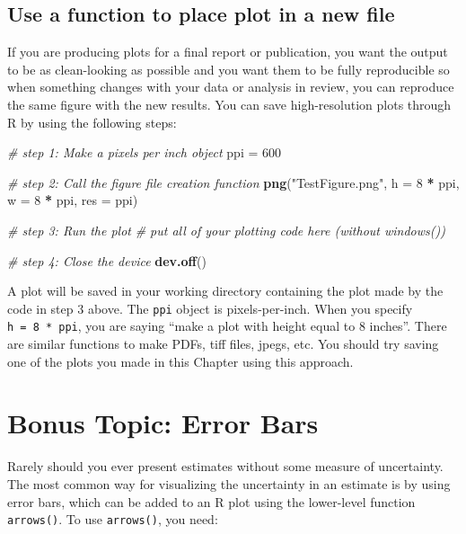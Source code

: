 \documentclass[]{book}
\newenvironment{Shaded}{\begin{snugshade}}{\end{snugshade}}
\newcommand{\KeywordTok}[1]{\textcolor[rgb]{0.13,0.29,0.53}{\textbf{#1}}}
\newcommand{\DataTypeTok}[1]{\textcolor[rgb]{0.13,0.29,0.53}{#1}}
\newcommand{\DecValTok}[1]{\textcolor[rgb]{0.00,0.00,0.81}{#1}}
\newcommand{\StringTok}[1]{\textcolor[rgb]{0.31,0.60,0.02}{#1}}
\newcommand{\CommentTok}[1]{\textcolor[rgb]{0.56,0.35,0.01}{\textit{#1}}}
\newcommand{\OperatorTok}[1]{\textcolor[rgb]{0.81,0.36,0.00}{\textbf{#1}}}
\newcommand{\NormalTok}[1]{#1}
\theoremstyle{definition}
\theoremstyle{definition}
\theoremstyle{definition}
\theoremstyle{remark}
\begin{document}
\subsection{Use a function to place plot in a new
file}\label{file-devices}

If you are producing plots for a final report or publication, you want
the output to be as clean-looking as possible and you want them to be
fully reproducible so when something changes with your data or analysis
in review, you can reproduce the same figure with the new results. You
can save high-resolution plots through R by using the following steps:

\begin{Shaded}
\begin{Highlighting}[]
\CommentTok{# step 1: Make a pixels per inch object}
\NormalTok{ppi =}\StringTok{ }\DecValTok{600}

\CommentTok{# step 2: Call the figure file creation function}
\KeywordTok{png}\NormalTok{(}\StringTok{"TestFigure.png"}\NormalTok{, }\DataTypeTok{h =} \DecValTok{8} \OperatorTok{*}\StringTok{ }\NormalTok{ppi, }\DataTypeTok{w =} \DecValTok{8} \OperatorTok{*}\StringTok{ }\NormalTok{ppi, }\DataTypeTok{res =}\NormalTok{ ppi)}

\CommentTok{# step 3: Run the plot }
\CommentTok{# put all of your plotting code here (without windows())}

\CommentTok{# step 4: Close the device}
\KeywordTok{dev.off}\NormalTok{()}
\end{Highlighting}
\end{Shaded}

A plot will be saved in your working directory containing the plot made
by the code in step 3 above. The \texttt{ppi} object is pixels-per-inch.
When you specify \texttt{h\ =\ 8\ *\ ppi}, you are saying ``make a plot
with height equal to 8 inches''. There are similar functions to make
PDFs, tiff files, jpegs, etc. You should try saving one of the plots you
made in this Chapter using this approach.

\section{Bonus Topic: Error Bars}\label{error-bars}

Rarely should you ever present estimates without some measure of
uncertainty. The most common way for visualizing the uncertainty in an
estimate is by using error bars, which can be added to an R plot using
the lower-level function \texttt{arrows()}. To use \texttt{arrows()},
you need:
\end{document}
